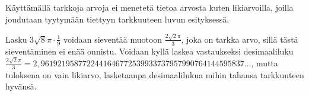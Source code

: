 Käyttämällä tarkkoja arvoja ei menetetä tietoa arvosta kuten likiarvoilla, joilla joudutaan tyytymään tiettyyn tarkkuuteen luvun esityksessä.

\begin{esimerkki}
Lasku $3\sqrt{8}\pi \cdot \frac{1}{9}$ voidaan sieventää muotoon $\frac{2\sqrt{2}\pi}{3}$, joka on tarkka arvo, sillä tästä sieventäminen ei enää onnistu. Voidaan kyllä laskea vastaukseksi desimaaliluku $\frac{2\sqrt{2}\pi}{3}=2,9619219587722441646772539933737957990764144595837\ldots$, mutta tuloksena on vain likiarvo, lasketaanpa desimaalilukua mihin tahansa tarkkuuteen hyvänsä.
\end{esimerkki}

